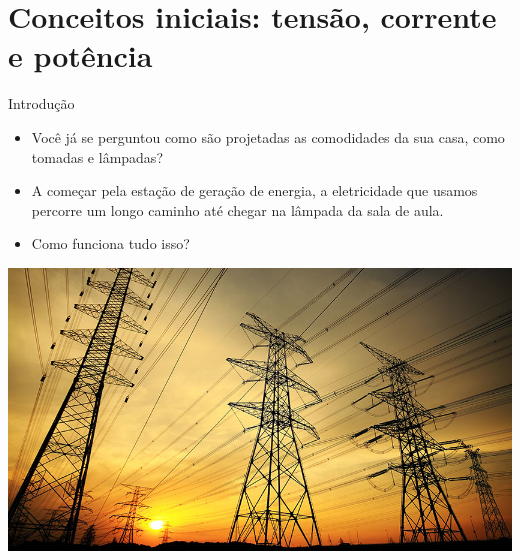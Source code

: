 \section{Conceitos iniciais: tensão, corrente e potência}

\begin{frame}{Introdução}
	\begin{block}{}
		\begin{itemize}
			\item Você já se perguntou como são projetadas as comodidades da sua casa, como tomadas e lâmpadas?
			\item A começar pela estação de geração de energia, a eletricidade que usamos percorre um longo caminho até chegar na lâmpada da sala de aula.
			\item Como funciona tudo isso?
		\end{itemize}

	\end{block}

	\centering
	\includegraphics[width=0.65\linewidth]{Figuras/Ch01/fig1}

\end{frame}


